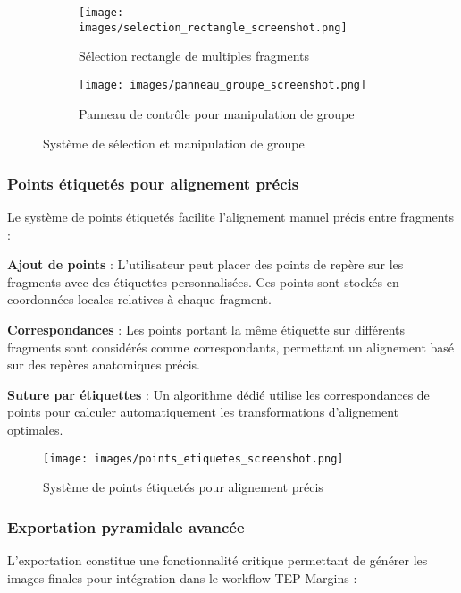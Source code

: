 \documentclass[12pt,a4paper]{report}
\begin{document}
\begin{figure}[H]
\centering
\begin{subfigure}{0.48\textwidth}
\texttt{[image: images/selection\_rectangle\_screenshot.png]}
\caption{Sélection rectangle de multiples fragments}
\end{subfigure}
\hfill
\begin{subfigure}{0.48\textwidth}
\texttt{[image: images/panneau\_groupe\_screenshot.png]}
\caption{Panneau de contrôle pour manipulation de groupe}
\end{subfigure}
\caption{Système de sélection et manipulation de groupe}
\label{fig:selection_groupe}
\end{figure}

\subsubsection{Points étiquetés pour alignement précis}

Le système de points étiquetés facilite l'alignement manuel précis entre fragments :

\textbf{Ajout de points} : L'utilisateur peut placer des points de repère sur les fragments avec des étiquettes personnalisées. Ces points sont stockés en coordonnées locales relatives à chaque fragment.

\textbf{Correspondances} : Les points portant la même étiquette sur différents fragments sont considérés comme correspondants, permettant un alignement basé sur des repères anatomiques précis.

\textbf{Suture par étiquettes} : Un algorithme dédié utilise les correspondances de points pour calculer automatiquement les transformations d'alignement optimales.

\begin{figure}[H]
\centering
\texttt{[image: images/points\_etiquetes\_screenshot.png]}
\caption{Système de points étiquetés pour alignement précis}
\label{fig:points_etiquetes}
\end{figure}

\subsubsection{Exportation pyramidale avancée}

L'exportation constitue une fonctionnalité critique permettant de générer les images finales pour intégration dans le workflow TEP Margins :
\end{document}
